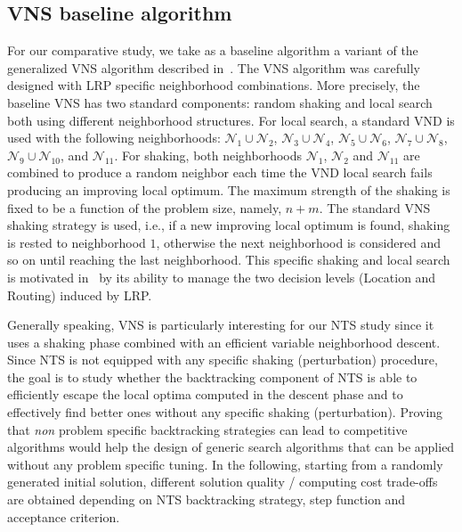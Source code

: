 \documentclass{acm_proc_article-sp}
\newcommand{\m}[1]{\mathcal{#1}}
\begin{document}
\subsection{VNS baseline algorithm}
For our comparative study, we take as a baseline algorithm a variant of the generalized VNS algorithm described in~\cite{lrpvns}. The VNS algorithm was carefully designed with LRP specific neighborhood combinations. More precisely, the baseline VNS has two standard components: random shaking and local search both using different neighborhood structures. For local search, a standard VND is used with the following neighborhoods: $\m{N}_1 \cup \m{N}_2$, $\m{N}_3 \cup \m{N}_4$, $\m{N}_5 \cup \m{N}_6$, $\m{N}_7 \cup \m{N}_8$, $\m{N}_9 \cup \m{N}_{10}$, and $\m{N}_{11}$. For shaking, both neighborhoods $\m{N}_1$, $\m{N}_2$ and $\m{N}_{11}$ are combined to produce a random neighbor each time the VND local search fails producing an improving local optimum. The maximum strength of the shaking is fixed to be a function of the problem size, namely, $n+m$. The standard VNS shaking strategy is used, i.e., if a new improving local optimum is found, shaking is rested to neighborhood $1$, otherwise the next neighborhood is considered and so on until reaching the last neighborhood. This specific shaking and local search is motivated in~\cite{lrpvns} by its ability to manage the two decision levels (Location and Routing) induced by LRP.

Generally speaking, VNS is particularly interesting for our NTS study since it uses a shaking phase combined with an efficient variable neighborhood descent. Since NTS is not equipped with any specific shaking (perturbation) procedure, the goal is to study whether the backtracking component of NTS is able to efficiently escape the local optima computed in the descent phase and to effectively find better ones without any specific shaking (perturbation). Proving that \emph{non} problem specific backtracking strategies can lead to competitive algorithms would help the design of generic search algorithms that can be applied without any problem specific tuning. In the following, starting from a randomly generated initial solution, different solution quality / computing cost trade-offs are obtained depending on NTS backtracking strategy, step function and acceptance criterion.
\end{document}
